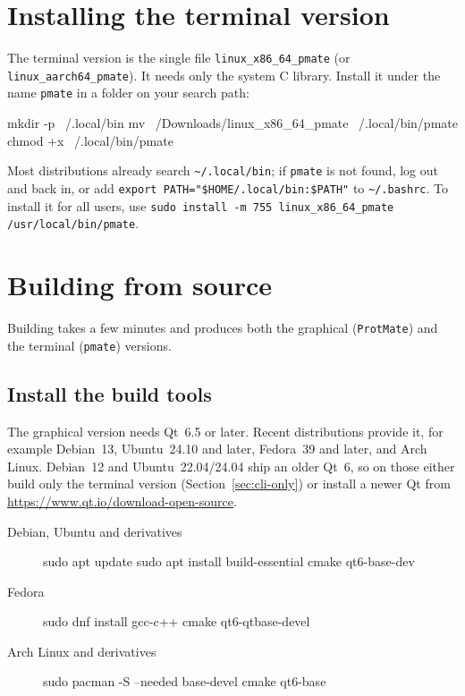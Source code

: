 \documentclass[11pt,a4paper,oneside]{report}
\newcommand{\cmd}[1]{\texttt{#1}}            %
\begin{document}
\section{Installing the terminal version}

The terminal version is the single file \cmd{linux\_x86\_64\_pmate} (or
\cmd{linux\_aarch64\_pmate}). It needs only the system C library. Install it under the name
\cmd{pmate} in a folder on your search path:

\begin{terminal}
mkdir -p ~/.local/bin
mv ~/Downloads/linux_x86_64_pmate ~/.local/bin/pmate
chmod +x ~/.local/bin/pmate
\end{terminal}

Most distributions already search \cmd{\textasciitilde/.local/bin}; if \cmd{pmate} is not
found, log out and back in, or add \cmd{export PATH="\$HOME/.local/bin:\$PATH"} to
\cmd{\textasciitilde/.bashrc}. To install it for all users, use
\cmd{sudo install -m 755 linux\_x86\_64\_pmate /usr/local/bin/pmate}.

\section{Building from source}\label{sec:linux-build}

Building takes a few minutes and produces both the graphical (\cmd{ProtMate}) and the terminal
(\cmd{pmate}) versions.

\subsection{Install the build tools}

The graphical version needs Qt~6.5 or later. Recent distributions provide it, for example Debian~13,
Ubuntu~24.10 and later, Fedora~39 and later, and Arch Linux. Debian~12 and Ubuntu~22.04/24.04 ship
an older Qt~6, so on those either build only the terminal version
(Section~\ref{sec:cli-only}) or install a newer Qt from \url{https://www.qt.io/download-open-source}.

\begin{description}
  \item[Debian, Ubuntu and derivatives]\leavevmode
\begin{terminal}
sudo apt update
sudo apt install build-essential cmake qt6-base-dev
\end{terminal}
  \item[Fedora]\leavevmode
\begin{terminal}
sudo dnf install gcc-c++ cmake qt6-qtbase-devel
\end{terminal}
  \item[Arch Linux and derivatives]\leavevmode
\begin{terminal}
sudo pacman -S --needed base-devel cmake qt6-base
\end{terminal}
\end{description}
\end{document}
